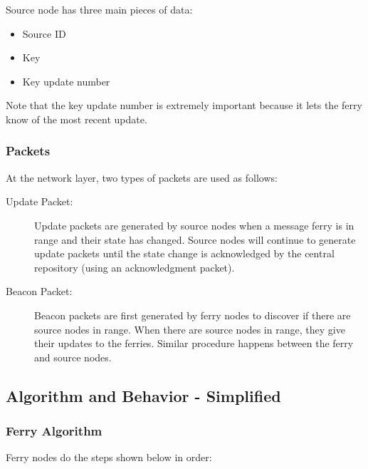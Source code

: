 Source node has three main pieces of data:
\begin{itemize}
\item Source ID
\item Key
\item Key update number
\end{itemize}

Note that the key update number is extremely important because it lets the ferry know of the most recent update.


\subsubsection{Packets}

At the network layer, two types of packets are used as follows:

\begin{description}
\item[Update Packet: ]
Update packets are generated by source nodes when a message ferry is in range and their state has changed. 
Source nodes will continue to generate update packets until the state change is acknowledged by the central repository (using an acknowledgment packet).
\item[Beacon Packet: ] 
Beacon packets are first generated by ferry nodes to discover if there are source nodes in range. 
When there are source nodes in range, they give their updates to the ferries. Similar procedure happens between the ferry and source nodes. 
\end{description}

\subsection{Algorithm and Behavior - Simplified}

\subsubsection{Ferry Algorithm}

Ferry nodes do the steps shown below in order:

